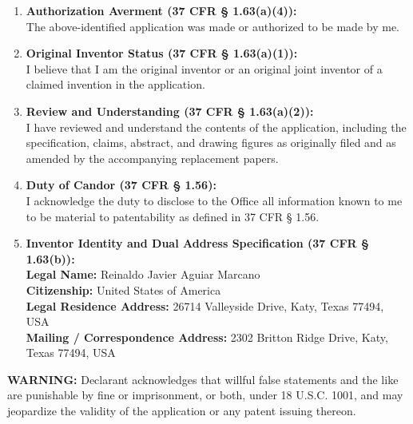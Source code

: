 \documentclass[11pt,letterpaper]{article}
\begin{document}
\begin{enumerate}[leftmargin=*]
    \item \textbf{Authorization Averment (37 CFR \S{} 1.63(a)(4)):} \\
    The above-identified application was made or authorized to be made by me.

    \item \textbf{Original Inventor Status (37 CFR \S{} 1.63(a)(1)):} \\
    I believe that I am the original inventor or an original joint inventor of a claimed invention in the application.

    \item \textbf{Review and Understanding (37 CFR \S{} 1.63(a)(2)):} \\
    I have reviewed and understand the contents of the application, including the specification, claims, abstract, and drawing figures as originally filed and as amended by the accompanying replacement papers.

    \item \textbf{Duty of Candor (37 CFR \S{} 1.56):} \\
    I acknowledge the duty to disclose to the Office all information known to me to be material to patentability as defined in 37 CFR \S{} 1.56.

    \item \textbf{Inventor Identity and Dual Address Specification (37 CFR \S{} 1.63(b)):} \\
    \textbf{Legal Name:} Reinaldo Javier Aguiar Marcano \\
    \textbf{Citizenship:} United States of America \\
    \textbf{Legal Residence Address:} 26714 Valleyside Drive, Katy, Texas 77494, USA \\
    \textbf{Mailing / Correspondence Address:} 2302 Britton Ridge Drive, Katy, Texas 77494, USA
\end{enumerate}

\vspace{0.4cm}
\textbf{WARNING:} Declarant acknowledges that willful false statements and the like are punishable by fine or imprisonment, or both, under 18 U.S.C. 1001, and may jeopardize the validity of the application or any patent issuing thereon.
\end{document}
